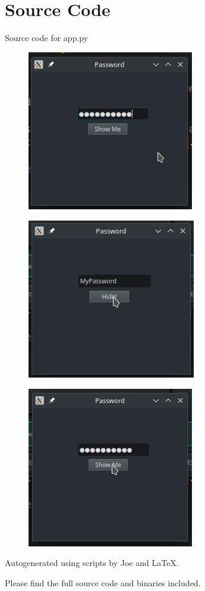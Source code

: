 \documentclass[12pt]{article}
\begin{document}
\maketitle
\pagebreak


\section{Source Code}

Source code for \textsf{app.py}


% 

\newpage

\begin{figure}[H]
  \centering
  \includegraphics[height=7cm]{ex1.png}
\end{figure}

\begin{figure}[H]
  \centering
  \includegraphics[height=7cm]{ex2.png}
\end{figure}

\begin{figure}[H]
  \centering
  \includegraphics[height=7cm]{ex3.png}
\end{figure}

\newpage

Autogenerated using scripts by Joe and \LaTeX.

Please find the full source code and binaries included.
\end{document}
